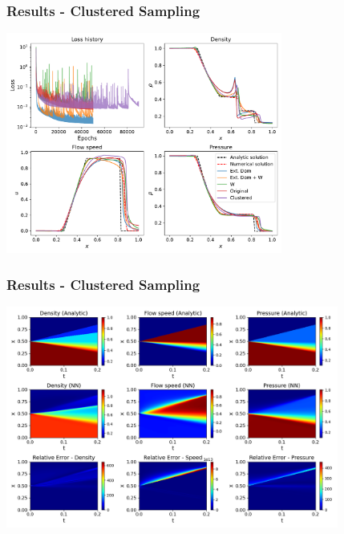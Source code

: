 \documentclass[aspectratio=169]{beamer}
\begin{document}
\begin{frame}\frametitle{Results - Clustered Sampling}
	
	\begin{center}
		\includegraphics[width=0.68\textwidth]{Figures/Figure_9.pdf}
	\end{center}

\end{frame}

\begin{frame}\frametitle{Results - Clustered Sampling}
	
	\begin{center}
		\includegraphics[width=0.82\textwidth]{Figures/Figure_10.png}
	\end{center}
	
\end{frame}
\end{document}
